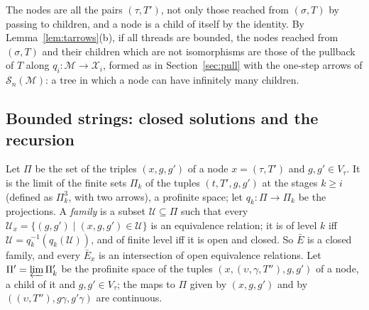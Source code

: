 \documentclass[11pt]{amsart}
\theoremstyle{definition}
\newcommand{\cX}{\mathcal X}
\newcommand{\cM}{\mathcal M}
\newcommand{\cS}{\mathcal S}
\begin{document}
The nodes are all the pairs $(\tau,T')$, not only those reached from
$(\sigma,T)$ by passing to children, and a node is a child of itself
by the identity. By Lemma~\ref{lem:tarrows}(b), if all threads are
bounded, the nodes reached from $(\sigma,T)$ and their children which
are not isomorphisms are those of the pullback of $T$ along $q_i\colon\cM\to\cX_i$, formed as in
Section~\ref{sec:pull} with the one-step arrows of $\cS_n(\cM)$: a
tree in which a node can have infinitely many children.

\subsection*{Bounded strings: closed solutions and the recursion}
Let $\Pi$ be the set of the triples $(x,g,g')$ of a node
$x=(\tau,T')$ and $g,g'\in V_\tau$. It is the limit of the finite
sets $\Pi_k$ of the tuples $(t,T',g,g')$ at the stages $k\ge i$
(defined as $\Pi^3_k$, with two arrows), a profinite space; let
$q_k\colon\Pi\to\Pi_k$ be the projections. A \emph{family} is a
subset $\mathcal U\subseteq\Pi$ such that every $\mathcal U_x=\{(g,g')
\mid(x,g,g')\in\mathcal U\}$ is an equivalence relation; it is of
level $k$ iff $\mathcal U=q_k^{-1}(q_k(\mathcal U))$, and of finite
level iff it is open and closed. So $\bar E$ is a closed family, and
every $\bar E_x$ is an intersection of open equivalence relations.
Let $\Pi'=\varprojlim\Pi'_k$ be the profinite space of the tuples
$(x,(\upsilon,\gamma,T''),g,g')$ of a node, a child of it and
$g,g'\in V_\tau$; the maps to $\Pi$ given by $(x,g,g')$ and by
$((\upsilon,T''),g\gamma,g'\gamma)$ are continuous.
\end{document}
